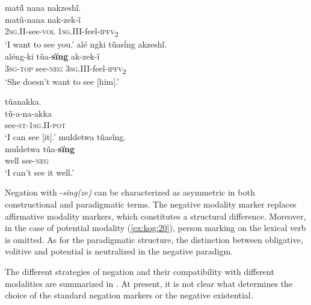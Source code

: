 \documentclass[output=paper,colorlinks,citecolor=brown]{langscibook}
\begin{document}
\ea\label{ex:kog:20}
    \ea\label{ex:kog:20a}matṹ nana nakzeshĩ.\\
        \gll   matũ-nana nak-zek-ĩ\\ 
              \textsc{2sg.II{}-}see-\textsc{vol} \textsc{1sg.III{}-}feel-\textsc{ipfv}\textsc{\textsubscript{2}}\\
        \glt  ‘I want to see you.’ 
    \ex\label{ex:kog:20b}alé ngki tũasḯng akzeshĩ.\\
        \gll  aléng-ki tũa{}-\textbf{sïng} ak-zek-ĩ\\
              3\textsc{sg-top} see\textsc{{}-neg} \textsc{3sg.III{}-}feel-\textsc{ipfv}\textsc{\textsubscript{2}}\\
        \glt ‘She doesn't want to see [him].’ 
    \z
\z 

\ea\label{ex:kog:21}
    \ea\label{ex:kog:21a}tũanakka.\\
        \gll  tũ{}-a-na-akka\\ 
               see\textsc{{}-st-1sg.II{}-pot}\\
        \glt  ‘I can see [it].’
    \ex\label{ex:kog:21b}muldetwa tũasĩng.\\
        \gll muldetwa tũa-\textbf{sïng} \\
              well see\textsc{{}-neg}\\
        \glt ‘I can't see it well.’ 
    \z
\z 

Negation with -\textit{sïng(ze)} can be characterized as asymmetric in both constructional and paradigmatic terms. The negative modality marker replaces affirmative modality markers, which constitutes a structural difference. Moreover, in the case of potential modality (\ref{ex:kog:20}), person marking on the lexical verb is omitted. As for the paradigmatic structure, the distinction between obligative, volitive and potential is neutralized in the negative paradigm.

The different strategies of negation and their compatibility with different modalities are summarized in . At present, it is not clear what determines the choice of the standard negation markers or the negative existential.
\end{document}
